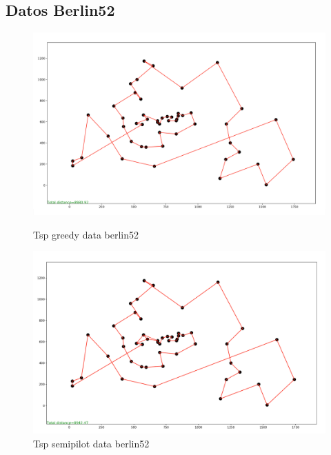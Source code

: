 \documentclass{article}
\begin{document}
\subsection{Datos Berlin52}

\begin{figure}[H]
	\begin{minipage}{0.5\textwidth}
		\centering
		\includegraphics[width=1\textwidth]{../image/greedy/greedy-berlin52.png}
		\caption{\label{fig:Figura1} Tsp greedy data berlin52}
	\end{minipage}\hfill
	\begin {minipage}{0.5\textwidth}
		\centering
		\includegraphics[width=1\textwidth]{../image/semipilot/semipilot-berlin52-2-2.png}
		\caption{\label{fig:Figura1} Tsp semipilot data berlin52}
	\end{minipage}
\end{figure}
\end{document}
